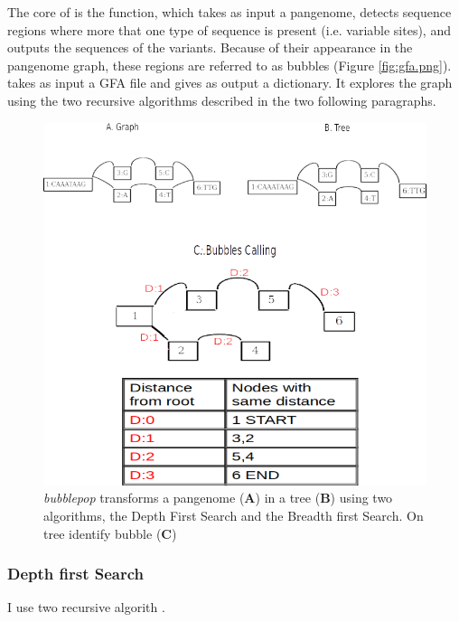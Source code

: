 The core of \vgp is the \bbp function, which takes as input a pangenome, detects sequence regions where more that one type of sequence is present (i.e. variable sites), and outputs the sequences of the variants. Because of their appearance in the pangenome graph, these regions are referred to as bubbles (Figure \ref{fig:gfa.png}). \\

\bbp takes as input a GFA file and gives as output a dictionary. It explores the graph using the two recursive algorithms described in the two following paragraphs.

\begin{figure}[H]
\centering
\includegraphics[width=1.00\textwidth]{fig/bubblepop.png}
\decoRule
\caption{\textit{bubblepop} transforms a pangenome (\textbf{A}) in a tree (\textbf{B}) using two algorithms, the Depth First Search and the Breadth first Search. On tree identify bubble (\textbf{C})}
\label{fig:bubblepop.png}
\end{figure}




\setcounter{secnumdepth}{3}
\subsubsection{Depth first Search}

I use two recursive algorith \cite{geeksforgeeks.org}.%



